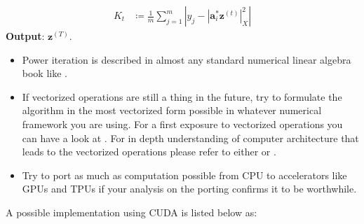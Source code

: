 {\begin{algorithm}
\begin{equation*}
\begin{split}
        K_t             &\coloneqq \frac{1}{m}\sum_{j=1}^{m}\left|y_j-\left|\boldsymbol{a}_i^*\boldsymbol{z}^{(t)}\right|_X^2\right|
      \end{split}
    \end{equation*}
    \textbf{Output}: $\boldsymbol{z}^{(T)}$.
  \end{algorithm}
  \begin{itemize}
    \item Power iteration is described in almost any standard numerical linear algebra book like \cite{Trefethen2022}\cite{Demmel1997}\cite{Golub2013}. 
    \item If vectorized operations are still a thing in the future, try to formulate the algorithm in the most vectorized form possible in whatever 
    numerical framework you are using. For a first exposure to vectorized operations you can have a look at \cite{Hager2010}. For in depth understanding of 
    computer architecture that leads to the vectorized operations please refer to either \cite{Patterson2014} or \cite{Hennessy2019}.
    \item Try to port as much as computation possible from \ac{CPU} to accelerators like \ac{GPU}s and \ac{TPU}s if 
    your analysis on the porting confirms it to be worthwhile.
  \end{itemize}
  A possible \pytorch\cite{Paszke2019} implementation using \ac{CUDA}\cite{Nvidia} is listed below as:
  \label{code:twf}    
\clearpage %
}
